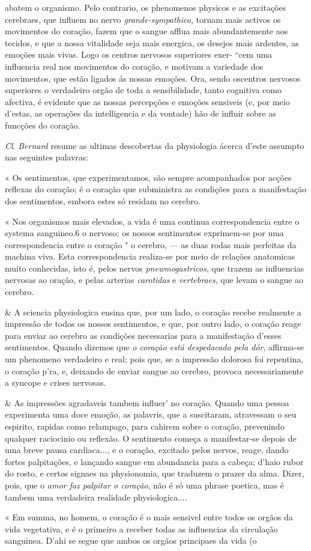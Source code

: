 abatem o organismo. Pelo contrario, os phenomenos physicos e as excitações cerebraes, que influem no nervo \emph{grande-sympathico}, tornam mais activos os movimentos do coração, fazem que o sangue afflua mais abundantemente aos tecidos, e que a nossa vitalidade seja mais energica, os desejos mais ardentes, as emoções mais vivas. Logo os centros nervosos superiores exer- “cem uma influencia real nos movimentos do coração, e motivam a variedade dos movimentos, que estão ligados ás nossas emoções. Ora, sendo oscentros nervosos superiores o verdadeiro orgão de toda a sensibilidade, tanto cognitiva como afectiva, é evidente que as nossas percepções e emoções sensiveis (e, por meio d'estas, as operações da intelligencia e da vontade) hão de influir sobre as funcções do coração.\par \emph{Cl}. \emph{Bernard} resume as ultimas descobertas da physiologia ácerca d'este assumpto nas seguintes palavras:\par « Os sentimentos, que experimentamos, são sempre acompanhados por acções reflexas do coração; é o coração que subministra as condições para a manifestação dos sentimentos, embora estes só residam no cerebro.\par « Nos organismos mais elevados, a vida é uma continua correspondencia entre o systema sanguineo.6 o nervoso; os nossos sentimentos exprimem-se por uma correspondencia entre o coração " o cerebro, --- as duas rodas mais perfeitas da machina viva. Esta correspondencia realiza-se por meio de relações anatomicas muito conhecidas, isto é, pelos nervos \emph{pnewmogastricos}, que trazem as influencias nervosas ao oração, e pelas arterias \emph{carotidas} e \emph{vertebraes}, que levam o sangue ao cerebro.\par \& A sciencia physiologica ensina que, por um lado, o coração recebe realmente a impressão de todos os nossos sentimentos, e que, por outro lado, o coração reage para enviar ao cerebro as condições necessarias para a manifestação d'esses sentimentos. Quando dizemos que \emph{o coração está despedacado pela dór}, affirma-se um phenomeno verdadeiro e real; pois que, se a impressão dolorosa foi repentina, o coração p'ra, e, deixando de enviar sangue ao cerebro, provoca necessariamente a syncope e crises nervosas.\par \& As impressões agradaveis tambem influer' no coração. Quando uma pessoa experimenta uma doce emoção, as palavris, que a suscitaram, atravessam o seu espirito, rapidas como relampago, para cahirem sobre o coração, prevenindo qualquer raciocinio ou reflexão. O sentimento começa a manifestar-se depois de uma breve pausa cardiaca..., e o coração, excitado pelos nervos, reage, dando fortes palpitações, e lançando sangue em abundancia para a cabeça; d'haio rubor do rosto, e certos signaes na physionomia, que traduzem o prazer da alma. Dizer, pois, que o \emph{amor faz palpitar o coração}, não é só uma phrase poetica, mas é tambem uma verdadeira realidade physiologica....\par « Em summa, no homem, o coração é o mais sensivel entre todos os orgãos da vida vegetativa, e é o primeiro a receber todas as influencias da circulação sanguinea. D'ahi se segue que ambos os orgãos principaes da vida (o 